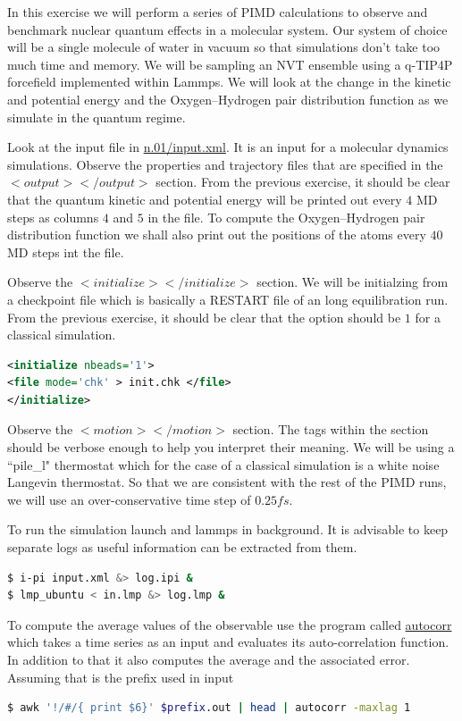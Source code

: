 \documentclass{article}
\begin{document}
\begin{Exercise}[label={basic},title={Benchmark of quantum effects in a water molecule}]
\noindent In this exercise we will perform a series of PIMD calculations to observe and benchmark nuclear quantum effects in a molecular system. Our system of choice will be a single molecule of water in vacuum so that simulations don't take too much time and memory. We will be sampling an NVT ensemble using a q-TIP4P forcefield implemented within Lammps. We will look at the change in the kinetic and potential energy and the Oxygen--Hydrogen pair distribution function as we simulate in the quantum regime.

\Question
Look at the \ipi{} input file in \url{n.01/input.xml}. It is an \ipi{} input for a molecular dynamics simulations. Observe the 
properties and trajectory files that are specified in the \lstinxml$<output></output>$ section. From the previous exercise, it should be clear that the quantum kinetic and potential energy will be printed out every $4$ MD steps as columns $4$ and $5$ in the  file. To compute the Oxygen--Hydrogen pair distribution function we shall also print out the positions of the atoms every $40$ MD steps int the  file.

\Question
Observe the \lstinxml$<initialize></initialize>$ section. We will be initialzing from a checkpoint file  which is basically a RESTART file of an long equilibration run. From the previous exercise, it should be clear that the option  should be $1$ for a classical simulation.

\begin{lstlisting}[language=xml]
<initialize nbeads='1'>  
<file mode='chk' > init.chk </file>
</initialize>
\end{lstlisting}

\Question
Observe the \lstinxml$<motion></motion>$ section. The tags within the section should be verbose enough to help you interpret their meaning. We will be using a ``pile\_l" thermostat which for the case of a classical simulation is a white noise Langevin thermostat. So that we are consistent with the rest of the PIMD runs, we will use an over-conservative time step of $0.25 fs$. 

\Question
To run the simulation launch \ipi{} and lammps in background. It is advisable to keep separate logs as useful information can be extracted from them.
\begin{lstlisting}[language=bash]
$ i-pi input.xml &> log.ipi &
$ lmp_ubuntu < in.lmp &> log.lmp &
\end{lstlisting}
To compute the average values of the observable use the program called \url{autocorr} which takes a time series as an input and evaluates its auto-correlation function. In addition to that it also computes the average and the associated error. Assuming that  is the prefix used in \ipi{} input \begin{lstlisting}[language=bash]
$ awk '!/#/{ print $6}' $prefix.out | head | autocorr -maxlag 1
\end{lstlisting}


\end{Exercise}
\end{document}
